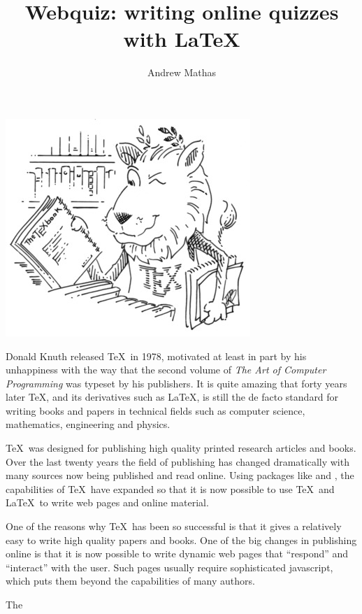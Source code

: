 \documentclass{ltugboat}
\author{Andrew Mathas}
\title{Webquiz: writing online quizzes with \LaTeX}
\begin{document}
\maketitle
\includegraphics[natwidth=600mm]{../examples/ctanLion}

Donald Knuth released \TeX\ in 1978, motivated at least in part by his
unhappiness with the way that the second volume of \textit{The Art
of Computer Programming} was typeset by his publishers. It is quite
amazing that forty years later \TeX, and its derivatives such as \LaTeX, is
still the de facto standard for writing books and papers in technical
fields such as computer science, mathematics, engineering and physics.

\TeX\ was designed for publishing high quality printed research articles
and books.  Over the last twenty years the field of publishing has
changed dramatically with many sources now being published and read
online.  Using packages like  and , the capabilities of
\TeX\ have expanded so that it is now possible to use \TeX\ and \LaTeX\
to write web pages and online material.

One of the reasons why \TeX\ has been so successful is that it gives a
relatively easy to write high quality papers and books. One of the big
changes in publishing online is that it is now possible to write dynamic
web pages that ``respond'' and ``interact'' with the user. Such pages
usually require sophisticated javascript, which puts them beyond the
capabilities of many authors.

The \WebQuiz
\end{document}
